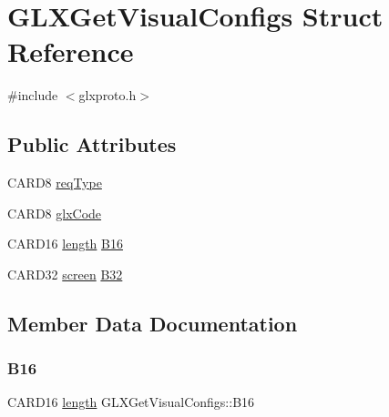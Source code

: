 \hypertarget{struct_g_l_x_get_visual_configs}{}\section{G\+L\+X\+Get\+Visual\+Configs Struct Reference}
\label{struct_g_l_x_get_visual_configs}


{\ttfamily \#include $<$glxproto.\+h$>$}

\subsection*{Public Attributes}
\begin{DoxyCompactItemize}
\item 
C\+A\+R\+D8 \hyperlink{struct_g_l_x_get_visual_configs_aef8634a003b75c3fb4144db10b836f49}{req\+Type}
\item 
C\+A\+R\+D8 \hyperlink{struct_g_l_x_get_visual_configs_a30903296ad447c4823f1e0327fb29a2a}{glx\+Code}
\item 
C\+A\+R\+D16 \hyperlink{glcorearb_8h_ab9c919755bde3b34349e23a32b4e0fa7}{length} \hyperlink{struct_g_l_x_get_visual_configs_ad59f2cc79877b2521a3fde9ce8c6e215}{B16}
\item 
C\+A\+R\+D32 \hyperlink{cad_8h_ae04e09e4e3831bfc1632c509ae37dcec}{screen} \hyperlink{struct_g_l_x_get_visual_configs_a93a57b4f87197e37a5fd866e753b591f}{B32}
\end{DoxyCompactItemize}


\subsection{Member Data Documentation}
\mbox{\label{struct_g_l_x_get_visual_configs_ad59f2cc79877b2521a3fde9ce8c6e215}} 
\subsubsection{\texorpdfstring{B16}{B16}}
{\footnotesize\ttfamily C\+A\+R\+D16 \hyperlink{glcorearb_8h_ab9c919755bde3b34349e23a32b4e0fa7}{length} G\+L\+X\+Get\+Visual\+Configs\+::\+B16}

\mbox{\label{struct_g_l_x_get_visual_configs_a93a57b4f87197e37a5fd866e753b591f}} 

